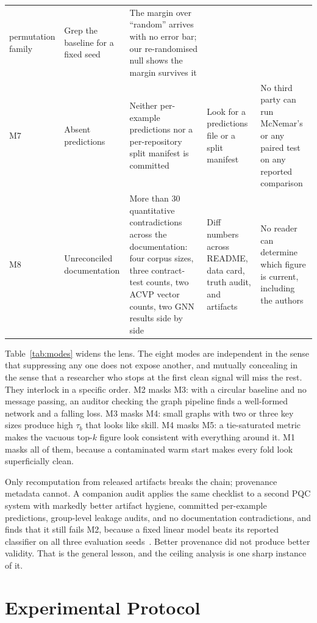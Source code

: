 \documentclass[journal,10pt]{IEEEtran}
\newcommand{\tb}{\tau_b}
\begin{document}
\begin{table}[t]
\begin{tabular}{@{}>{\raggedright\arraybackslash}p{0.7cm}>{\raggedright\arraybackslash}p{2.4cm}>{\raggedright\arraybackslash}p{3.4cm}>{\raggedright\arraybackslash}p{3.4cm}>{\raggedright\arraybackslash}p{3.7cm}@{}}
permutation family &
Grep the baseline for a fixed seed &
The margin over ``random'' arrives with no error bar; our re-randomised null shows the margin
survives it \\
\addlinespace
M7 & Absent predictions &
Neither per-example predictions nor a per-repository split manifest is committed &
Look for a predictions file or a split manifest &
No third party can run McNemar's or any paired test on any reported comparison \\
\addlinespace
M8 & Unreconciled documentation &
More than 30 quantitative contradictions across the documentation: four corpus sizes, three
contract-test counts, two ACVP vector counts, two GNN results side by side &
Diff numbers across README, data card, truth audit, and artifacts &
No reader can determine which figure is current, including the authors \\
\bottomrule
\end{tabular}
\end{table}

Table~\ref{tab:modes} widens the lens. The eight modes are independent in the sense that suppressing
any one does not expose another, and mutually concealing in the sense that a researcher who stops
at the first clean signal will miss the rest. They interlock in a specific order. M2 masks M3:
with a circular baseline and no message passing, an auditor checking the graph pipeline finds a
well-formed network and a falling loss. M3 masks M4: small graphs with two or three key sizes
produce high $\tb$ that looks like skill. M4 masks M5: a tie-saturated metric makes the vacuous
top-$k$ figure look consistent with everything around it. M1 masks all of them, because a
contaminated warm start makes every fold look superficially clean.

Only recomputation from released artifacts breaks the chain; provenance metadata cannot. A
companion audit applies the same checklist to a second PQC system with markedly better artifact
hygiene, committed per-example predictions, group-level leakage audits, and no documentation
contradictions, and finds that it still fails M2, because a fixed linear model beats its reported
classifier on all three evaluation seeds~\cite{qtrust_validity_audit}. Better provenance did not
produce better validity. That is the general lesson, and the ceiling analysis is one sharp instance
of it.

\section{Experimental Protocol}
\label{sec:protocol}
\end{document}
